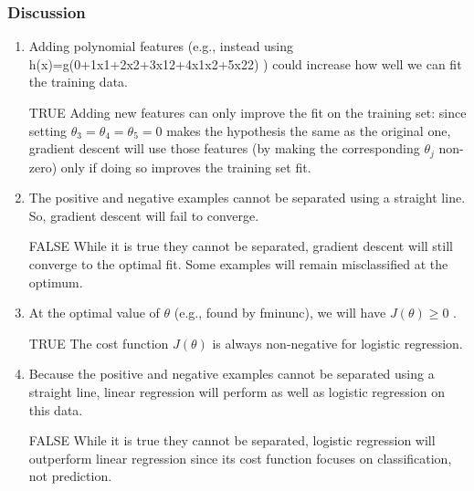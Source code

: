 \subsubsection*{Discussion}
\begin{enumerate}
\item Adding polynomial features (e.g., instead using h(x)=g(0+1x1+2x2+3x12+4x1x2+5x22) ) could increase how well we can fit the training data.  
\begin{framed}
TRUE
Adding new features can only improve the fit on the training set: since setting $\theta_3=\theta_4=\theta_5=0$ makes the hypothesis the same as the original one, gradient descent will use those features (by making the corresponding $\theta_j$ non-zero) only if doing so improves the training set fit. 
\end{framed}
\item 
The positive and negative examples cannot be separated using a straight line. So, gradient descent will fail to converge. 
\begin{framed}
	FALSE
While it is true they cannot be separated, gradient descent will still converge to the optimal fit. Some examples will remain misclassified at the optimum. 
\end{framed}

\item 
At the optimal value of $\theta$ (e.g., found by fminunc), we will have $ J(\theta) \geq$0 . 
\begin{framed}
	TRUE
The cost function $ J(\theta)$ is always non-negative for logistic regression. 
\end{framed}

\item 
Because the positive and negative examples cannot be separated using a straight line, linear regression will perform as well as logistic regression on this data. 
\begin{framed}
	FALSE
While it is true they cannot be separated, logistic regression will outperform linear regression since its cost function focuses on classification, not prediction. 
\end{framed}
\end{enumerate}












